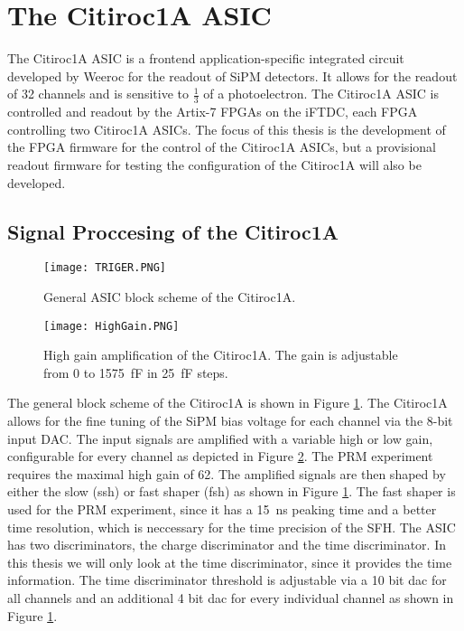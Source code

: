 \section{The Citiroc1A ASIC}
The Citiroc1A ASIC is a frontend application-specific integrated circuit developed by Weeroc for the readout of SiPM detectors.
It allows for the readout of 32 channels and is sensitive to $\frac{1}{3}$ of a photoelectron.\autocite{datasheetCITIROC}
\newline
The Citiroc1A ASIC is controlled and readout by the Artix-7 FPGAs on the iFTDC, each FPGA controlling two Citiroc1A ASICs.\autocite{InternalcommunicationIgor}
The focus of this thesis is the development of the FPGA firmware for the control of the Citiroc1A ASICs,
but a provisional readout firmware for testing the configuration of the Citiroc1A will also be developed.
\subsection{Signal Proccesing of the Citiroc1A}
\begin{figure}[h]
    \centering
    \texttt{[image: TRIGER.PNG]}
    \caption{General ASIC block scheme of the Citiroc1A.\autocite{datasheetCITIROC}}
    \label{fig:CITIROC1A_TRIGEER}
\end{figure}

\begin{figure}[h]
    \centering
    \texttt{[image: HighGain.PNG]}
    \caption{High gain amplification of the Citiroc1A. The gain is adjustable from 0 to \SI{1575}{\femto\farad} in \SI{25}{\femto\farad} steps.\autocite{datasheetCITIROC}}
    \label{HighGain}
\end{figure}
The general block scheme of the Citiroc1A is shown in Figure \ref{fig:CITIROC1A_TRIGEER}.
\newline
The Citiroc1A allows for the fine tuning of the SiPM bias voltage for each channel via the 8-bit input DAC.
\newline	
The input signals are amplified with a variable high or low gain, configurable for every channel as depicted in Figure \ref{HighGain}. 
The PRM experiment requires the maximal high gain of 62.\autocite{InternalcommunicationIgor}
\newline
The amplified signals are then shaped by either the slow (ssh) or fast shaper (fsh) as shown in Figure \ref{fig:CITIROC1A_TRIGEER}. 
The fast shaper is used for the PRM experiment, since it has a \SI{15}{\nano\second} peaking time and a better time resolution, which is neccessary for the time precision of the SFH.\autocite{datasheetCITIROC}
\newline
The ASIC has two discriminators, the charge discriminator and the time discriminator. In this thesis we will only look at the time discriminator,
since it provides the time information.
The time discriminator threshold is adjustable via a 10 bit dac for all channels and an additional 4 bit dac for every individual channel as shown in Figure \ref{fig:CITIROC1A_TRIGEER}\autocite{datasheetCITIROC}.


